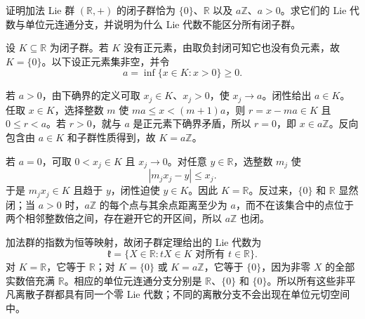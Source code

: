\begin{exercise}\label{g1:ex:closed-subgroups-real-line}
	证明加法 Lie 群 \((\mathbb R,+)\) 的闭子群恰为 \(\{0\}\)、\(\mathbb R\) 以及 \(a\mathbb Z\)、\(a>0\)。求它们的 Lie 代数与单位元连通分支，并说明为什么 Lie 代数不能区分所有闭子群。
\end{exercise}
\begin{solution}
	设 \(K\subseteq\mathbb R\) 为闭子群。若 \(K\) 没有正元素，由取负封闭可知它也没有负元素，故 \(K=\{0\}\)。以下设正元素集非空，并令
	\[
		a=\inf\{x\in K:x>0\}\ge0.
	\]

	若 \(a>0\)，由下确界的定义可取 \(x_j\in K\)、\(x_j>0\)，使 \(x_j\to a\)。闭性给出 \(a\in K\)。任取 \(x\in K\)，选择整数 \(m\) 使 \(ma\le x<(m+1)a\)，则 \(r=x-ma\in K\) 且 \(0\le r<a\)。若 \(r>0\)，就与 \(a\) 是正元素下确界矛盾，所以 \(r=0\)，即 \(x\in a\mathbb Z\)。反向包含由 \(a\in K\) 和子群性质得到，故 \(K=a\mathbb Z\)。

	若 \(a=0\)，可取 \(0<x_j\in K\) 且 \(x_j\to0\)。对任意 \(y\in\mathbb R\)，选整数 \(m_j\) 使
	\[
		|m_jx_j-y|\le x_j.
	\]
	于是 \(m_jx_j\in K\) 且趋于 \(y\)，闭性迫使 \(y\in K\)。因此 \(K=\mathbb R\)。反过来，\(\{0\}\) 和 \(\mathbb R\) 显然闭；当 \(a>0\) 时，\(a\mathbb Z\) 的每个点与其余点距离至少为 \(a\)，而不在该集合中的点位于两个相邻整数倍之间，存在避开它的开区间，所以 \(a\mathbb Z\) 也闭。

	加法群的指数为恒等映射，故闭子群定理给出的 Lie 代数为
	\[
		\mathfrak k=\{X\in\mathbb R:tX\in K\text{ 对所有 }t\in\mathbb R\}.
	\]
	对 \(K=\mathbb R\)，它等于 \(\mathbb R\)；对 \(K=\{0\}\) 或 \(K=a\mathbb Z\)，它等于 \(\{0\}\)，因为非零 \(X\) 的全部实数倍充满 \(\mathbb R\)。相应的单位元连通分支分别是 \(\mathbb R\)、\(\{0\}\) 和 \(\{0\}\)。所以所有这些非平凡离散子群都具有同一个零 Lie 代数；不同的离散分支不会出现在单位元切空间中。
\end{solution}

